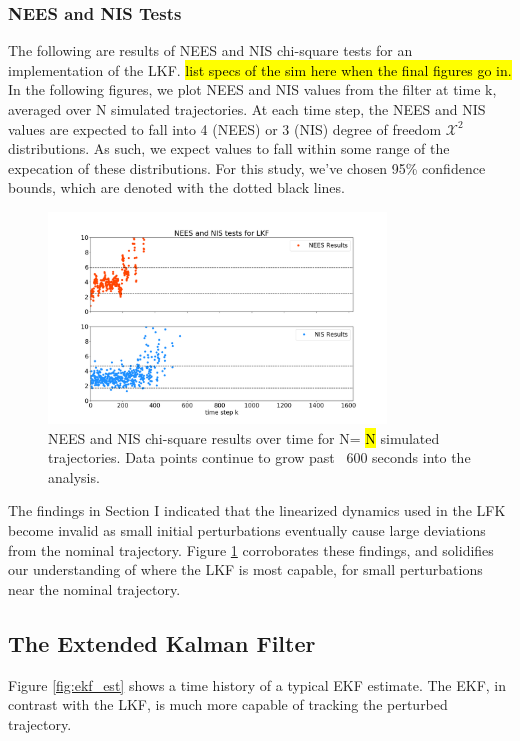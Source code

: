 \documentclass[11pt, a4paper]{article}
\begin{document}
\subsubsection{NEES and NIS Tests}
The following are results of NEES and NIS chi-square tests for an implementation of the LKF. 
\hl{list specs of the sim here when the final figures go in.} 
In the following figures, we plot NEES and NIS values from the filter at time k, averaged over N simulated trajectories. 
At each time step, the NEES and NIS values are expected to fall into 4 (NEES) or 3 (NIS) degree of freedom $\mathcal{X}^2$ distributions. 
As such, we expect values to fall within some range of the expecation of these distributions. 
For this study, we've chosen 95\% confidence bounds, which are denoted with the dotted black lines. 

\begin{figure}[H]
	\centering
	\includegraphics[width=0.8\textwidth]{./Figures/NEESNIS_lkf.png}
	\caption{NEES and NIS chi-square results over time for N= \hl{N} simulated trajectories. Data points continue to grow past ~600 seconds into the analysis.}
	\label{fig:neesnis_lkf}
\end{figure}

The findings in Section I indicated that the linearized dynamics used in the LFK become invalid as small initial perturbations eventually cause large deviations from the nominal trajectory. 
Figure \ref{fig:neesnis_lkf} corroborates these findings, and solidifies our understanding of where the LKF is most capable, for small perturbations near the nominal trajectory.  


\subsection{The Extended Kalman Filter}
Figure \ref{fig:ekf_est} shows a time history of a typical EKF estimate. 
The EKF, in contrast with the LKF, is much more capable of tracking the perturbed trajectory.  
\end{document}
